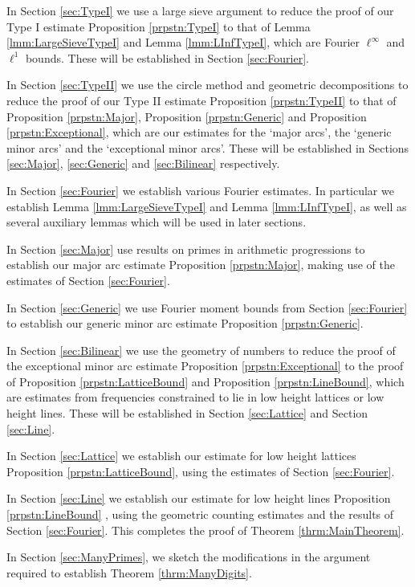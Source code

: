 \documentclass[10pt]{amsart}
\theoremstyle{plain}
\numberwithin{sblmm}{thrm}
\numberwithin{equation}{section}
\begin{document}
In Section \ref{sec:TypeI} we use a large sieve argument to reduce the proof of our Type I estimate Proposition \ref{prpstn:TypeI} to that of Lemma \ref{lmm:LargeSieveTypeI} and Lemma \ref{lmm:LInfTypeI}, which are Fourier $\ell^\infty$ and $\ell^1$ bounds. These will be established in Section \ref{sec:Fourier}.

In Section \ref{sec:TypeII} we use the circle method and geometric decompositions to reduce the proof of our Type II estimate  Proposition \ref{prpstn:TypeII} to that of Proposition \ref{prpstn:Major}, Proposition \ref{prpstn:Generic} and Proposition \ref{prpstn:Exceptional}, which are our estimates for the `major arcs', the `generic minor arcs' and the `exceptional minor arcs'. These will be established in Sections \ref{sec:Major}, \ref{sec:Generic} and \ref{sec:Bilinear} respectively.

In Section \ref{sec:Fourier} we establish various Fourier estimates. In particular we establish Lemma \ref{lmm:LargeSieveTypeI} and Lemma \ref{lmm:LInfTypeI}, as well as several auxiliary lemmas which will be used in later sections.

In Section \ref{sec:Major} use results on primes in arithmetic progressions to establish our major arc estimate Proposition \ref{prpstn:Major}, making use of the estimates of Section \ref{sec:Fourier}.

In Section \ref{sec:Generic} we use Fourier moment bounds from Section \ref{sec:Fourier} to establish our generic minor arc estimate Proposition \ref{prpstn:Generic}.

In Section \ref{sec:Bilinear} we use the geometry of numbers to reduce the proof of the exceptional minor arc estimate Proposition \ref{prpstn:Exceptional} to the proof of Proposition \ref{prpstn:LatticeBound} and Proposition \ref{prpstn:LineBound}, which are estimates from frequencies constrained to lie in low height lattices or low height lines. These will be established in Section \ref{sec:Lattice} and Section \ref{sec:Line}.

In Section \ref{sec:Lattice} we establish our estimate for low height lattices  Proposition \ref{prpstn:LatticeBound}, using the estimates of Section \ref{sec:Fourier}.

In Section \ref{sec:Line} we establish our estimate for low height lines Proposition \ref{prpstn:LineBound} , using the geometric counting estimates and the results of Section \ref{sec:Fourier}. This completes the proof of Theorem \ref{thrm:MainTheorem}.

In Section \ref{sec:ManyPrimes}, we sketch the modifications in the argument required to establish Theorem \ref{thrm:ManyDigits}.
\end{document}
